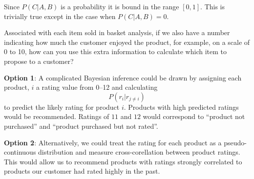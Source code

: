 \documentclass{hw}
\begin{document}
    Since $P(C | A, B)$ is a probability it is bound in the range $[0,1]$. This is trivially true except in the case when $P(C | A, B)=0$.

    Associated with each item sold in basket analysis, if we also have a number indicating how much the customer enjoyed the product, for example, on a scale of 0 to 10, how can you use this extra information to calculate which item to propose to a customer?

\solution
    \textbf{Option 1}: A complicated Bayesian inference could be drawn by assigning each product, $i$ a rating value from \numrange{0}{12} and calculating
    $$
        P(r_i | r_{j \neq i})
    $$
    to predict the likely rating for product $i$. Products with high predicted ratings would be recommended. Ratings of $11$ and $12$ would correspond to ``product not purchased'' and ``product purchased but not rated''.

    \textbf{Option 2}: Alternatively, we could treat the rating for each product as a pseudo-continuous distribution and measure cross-corellation between product ratings. This would allow us to recommend products with ratings strongly correlated to products our customer had rated highly in the past.
\end{document}
